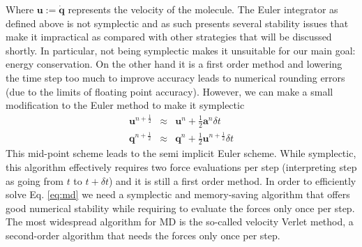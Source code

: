 \documentclass[twoside,openright,titlepage,numbers=noenddot,%
headinclude,footinclude,cleardoublepage=empty,abstract=on,
BCOR=5mm,fontsize=11pt, dvipsnames, paper=b5
]{scrreprt}
\renewcommand{\vec}[1]{\bm{#1}}
\newcommand{\dt}{\delta t}
\newcommand{\half}{\frac{1}{2}}
\newcommand{\ppos}{q}
\newcommand{\pvel}{u}
\begin{document}
Where $\vec{\pvel} := \dot{\vec{\ppos}}$ represents the velocity of the molecule.
The Euler integrator as defined above is not symplectic\cite{Hairer2006} and as such presents several stability issues that make it impractical as compared with other strategies that will be discussed shortly. In particular, not being symplectic makes it unsuitable for our main goal: energy conservation\cite{Hairer2006}. On the other hand it is a first order method and lowering the time step too much to improve accuracy leads to numerical rounding errors (due to the limits of floating point accuracy).
However, we can make a small modification to the Euler method to make it symplectic\cite{Hairer2006}
\begin{equation}
  \label{eq:semiimpliciteuler}
  \begin{aligned}
    \vec{\pvel}^{n+\half} &\approx& \vec{\pvel}^n + \half\vec{a}^n\dt\\
    \vec{\ppos}^{n+\half} &\approx& \vec{\ppos}^n + \half\vec{\pvel}^{n+\half}\dt
  \end{aligned}
\end{equation}
This mid-point scheme leads to the semi implicit Euler scheme. While symplectic, this algorithm effectively requires two force evaluations per step (interpreting step as going from $t$ to $t+\dt$) and it is still a first order method.
In order to efficiently solve Eq. \eqref{eq:md} we need a symplectic and memory-saving algorithm that offers good numerical stability while requiring to evaluate the forces only once per step.
The most widespread algorithm for \gls{MD} is the so-called velocity Verlet method\cite{Allen2017}, a second-order algorithm that needs the forces only once per step.
\end{document}
